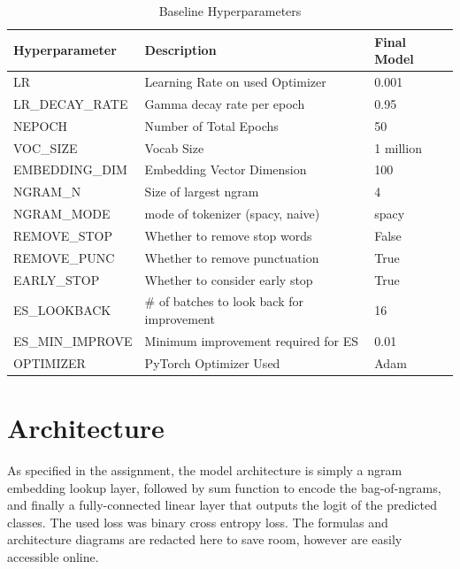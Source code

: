 \documentclass[a4paper,10pt]{article}
\begin{document}
\begin{table}[!htbp]
\begin{tabular}{| l | l | l |}
\hline
Hyperparameter   & Description                                & Final Model    \\
\hline
LR               & Learning Rate on used Optimizer            & 0.001          \\
LR\_DECAY\_RATE  & Gamma decay rate per epoch                 & 0.95           \\
NEPOCH           & Number of Total Epochs                     & 50             \\
VOC\_SIZE        & Vocab Size                                 & 1 million      \\
EMBEDDING\_DIM   & Embedding Vector Dimension                 & 100            \\
NGRAM\_N         & Size of largest ngram                      & 4              \\
NGRAM\_MODE      & mode of tokenizer (spacy, naive)           & spacy          \\
REMOVE\_STOP     & Whether to remove stop words               & False          \\
REMOVE\_PUNC     & Whether to remove punctuation              & True           \\
EARLY\_STOP      & Whether to consider early stop             & True           \\
ES\_LOOKBACK     & \# of batches to look back for improvement & 16             \\
ES\_MIN\_IMPROVE & Minimum improvement required for ES        & 0.01           \\
OPTIMIZER        & PyTorch Optimizer Used                     & Adam           \\
\hline
\end{tabular}
\caption{Baseline Hyperparameters}\label{tbl:finalhparams}
\end{table}

\section{Architecture}
As specified in the assignment, the model architecture is simply a ngram embedding lookup layer, followed by sum function to encode the bag-of-ngrams, and finally a fully-connected linear layer that outputs the logit of the predicted classes. The used loss was binary cross entropy loss. The formulas and architecture diagrams are redacted here to save room, however are easily accessible online.
\end{document}
